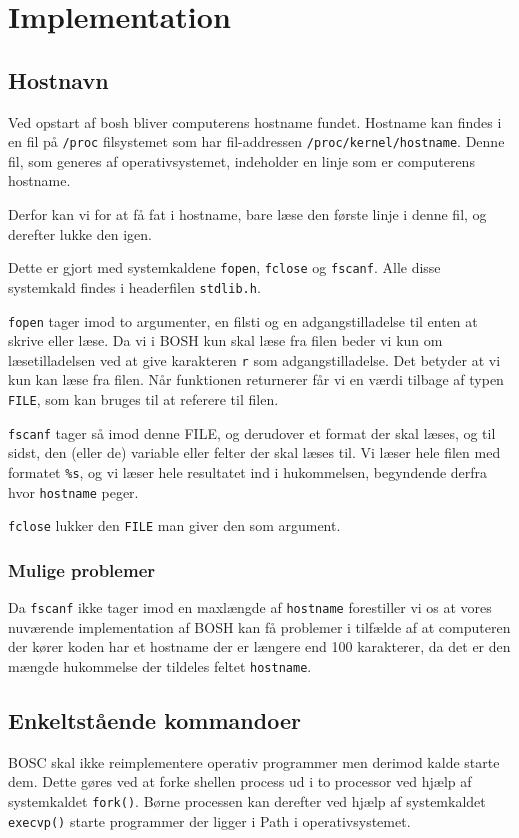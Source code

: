 \section{Implementation}
\subsection{Hostnavn}
Ved opstart af bosh bliver computerens hostname fundet. Hostname kan findes i en fil på \texttt{/proc} filsystemet som har fil-addressen \texttt{/proc/kernel/hostname}. Denne fil, som generes af operativsystemet, indeholder en linje som er computerens hostname.

Derfor kan vi for at få fat i hostname, bare læse den første linje i denne fil, og derefter lukke den igen.

Dette er gjort med systemkaldene \texttt{fopen}, \texttt{fclose} og \texttt{fscanf}. Alle disse systemkald findes i headerfilen \texttt{stdlib.h}.

\texttt{fopen} tager imod to argumenter, en filsti og en adgangstilladelse til enten at skrive eller læse. Da vi i BOSH kun skal læse fra filen beder vi kun om læsetilladelsen ved at give karakteren \texttt{r} som adgangstilladelse. Det betyder at vi kun kan læse fra filen. Når funktionen returnerer får vi en værdi tilbage af typen \texttt{FILE}, som kan bruges til at referere til filen.

\texttt{fscanf} tager så imod denne FILE, og derudover et format der skal læses, og til sidst, den (eller de) variable eller felter der skal læses til. Vi læser hele filen med formatet \texttt{\%s}, og vi læser hele resultatet ind i hukommelsen, begyndende derfra hvor \texttt{hostname} peger.

\texttt{fclose} lukker den \texttt{FILE} man giver den som argument.

\subsubsection{Mulige problemer}
Da \texttt{fscanf} ikke tager imod en maxlængde af \texttt{hostname} forestiller vi os at vores nuværende implementation af BOSH kan få problemer i tilfælde af at computeren der kører koden har et hostname der er længere end 100 karakterer, da det er den mængde hukommelse der tildeles feltet \texttt{hostname}.

\subsection{Enkeltstående kommandoer}
BOSC skal ikke reimplementere operativ programmer men derimod kalde starte dem. Dette gøres ved at forke shellen process ud i to processor ved hjælp af systemkaldet \verb+fork()+. Børne processen kan derefter ved hjælp af systemkaldet \verb+execvp()+ starte programmer der ligger i Path i operativsystemet. 

